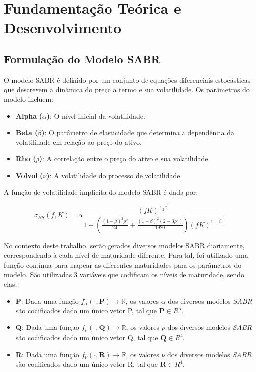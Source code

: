 \section{Fundamentação Teórica e Desenvolvimento}
\subsection{Formulação do Modelo SABR}

O modelo SABR é definido por um conjunto de equações diferenciais estocásticas que descrevem a dinâmica do preço a termo e sua volatilidade. Os parâmetros do modelo incluem:
\begin{itemize}
	\item \textbf{Alpha (\(\alpha\))}: O nível inicial da volatilidade.
	\item \textbf{Beta (\(\beta\))}: O parâmetro de elasticidade que determina a dependência da volatilidade em relação ao preço do ativo.
	\item \textbf{Rho (\(\rho\))}: A correlação entre o preço do ativo e sua volatilidade.
	\item \textbf{Volvol (\(\nu\))}: A volatilidade do processo de volatilidade.
\end{itemize}

A função de volatilidade implícita do modelo SABR é dada por:

\begin{equation}
	\sigma_{\textit{BS}}(f, K) = 
	\alpha \frac{(fK)^{\frac{1 - \beta}{2}}}{1 + \left(\frac{(1 - \beta)^2 \rho^2}{24} + \frac{(1 - \beta)^2(2 - 3\rho^2)}{1920} \right) (fK)^{1 - \beta}}
\end{equation}

No contexto deste trabalho, serão gerados diversos modelos SABR diariamente, correspondendo à cada nível de maturidade diferente. Para tal, foi utilizado uma função contínua para mapear as diferentes maturidades para os parâmetros do modelo. São utilizadas 3 variáveis que codificam os níveis de maturidade, sendo elas:

\begin{itemize}
	\item \textbf{P}: Dada uma função $f_{\alpha}(\cdot, \textbf{P}) \rightarrow \mathbb{R}$, os valores $\alpha$ dos diversos modelos \textit{SABR} são codificados dado um único vetor P, tal que $\textbf{P} \in R^{5}$.
	
	\item \textbf{Q}: Dada uma função $f_{\rho}(\cdot, \textbf{Q}) \rightarrow \mathbb{R}$, os valores $\rho$ dos diversos modelos \textit{SABR} são codificados dado um único vetor Q, tal que $\textbf{Q} \in R^{4}$.
	
	\item \textbf{R}: Dada uma função $f_{\nu}(\cdot, \textbf{R}) \rightarrow \mathbb{R}$, os valores $\nu$ dos diversos modelos \textit{SABR} são codificados dado um único vetor R, tal que $\textbf{R} \in R^{4}$.
\end{itemize}

